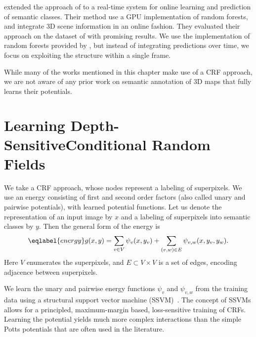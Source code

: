 \citet{stueckler2013} extended the approach of \citet{stuckler2012semantic} to
a real-time system for online learning and prediction of semantic classes.
Their method use a GPU implementation of random forests, and integrate 3D scene
information in an online fashion. They evaluated their approach on the dataset
of \citet{SilbermanECCV12} with promising results.  We use the implementation
of random forests provided by \citet{stueckler2013}, but instead of integrating
predictions over time, we focus on exploiting the structure within a single
frame.

While many of the works mentioned in this chapter make use of a CRF
approach, we are not aware of any prior work on semantic annotation of 3D maps
that fully learns their potentials.


\section[Learning Depth-Sensitive Conditional Random Fields]{Learning Depth-Sensitive\linebreak Conditional Random Fields}
We take a CRF approach, whose nodes represent a labeling of
superpixels.  We use an energy consisting of first and second order factors
(also called unary and pairwise potentials), with learned potential functions.
Let us denote the representation of an input image by $x$ and a labeling of
superpixels into semantic classes by $y$.  Then the general form of the energy is
\begin{equation}\eqlabel{energy}
    g(x, y) = \sum_{v \in V} \psi_v(x, y_v) + \sum_{(v, w) \in E} \psi_{v,w}(x, y_{v}, y_{w}).
\end{equation}
Here $V$ enumerates the superpixels, and $E\subset V \times V$ is a set of
edges, encoding adjacence between superpixels.

We learn the unary and pairwise energy functions $\psi_v$ and $\psi_{v, w}$ from the training data
using a structural support vector machine (SSVM)~\citep{joachims2009cutting}. 
The concept of SSVMs allows for a principled,
maximum-margin based, loss-sensitive training of CRFs. Learning the potential yields much
more complex interactions than the simple Potts potentials that are often used in the literature.

